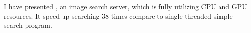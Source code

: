

I have presented \name{}, an image search server, which is fully utilizing CPU and GPU resources.
It speed up searching 38 times compare to single-threaded simple search program.
